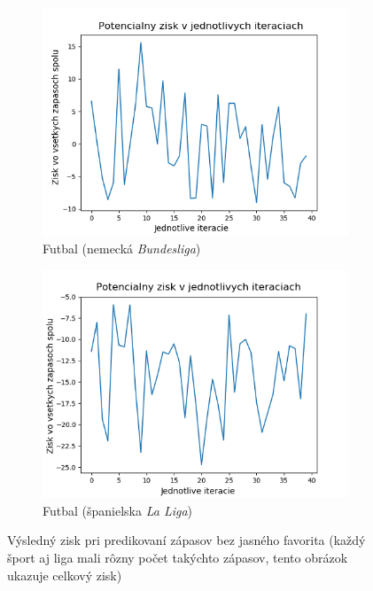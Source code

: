 \begin{figure}[h!]
\begin{subfigure}[b]{0.48\textwidth}
    \includegraphics[width=\textwidth]{../img/ffnn_ger_prof.png} 
    \caption{Futbal (nemecká \textit{Bundesliga})} 
  \end{subfigure}
  \hfill
  \begin{subfigure}[b]{0.48\textwidth}
    \includegraphics[width=\textwidth]{../img/ffnn_spa_prof.png} 
    \caption{Futbal (španielska \textit{La Liga})} 
  \end{subfigure}
  \caption{Výsledný zisk pri predikovaní zápasov bez jasného favorita (každý šport aj liga mali rôzny počet takýchto zápasov, tento obrázok ukazuje celkový zisk)} 
   \label{fig8} 
\end{figure}

